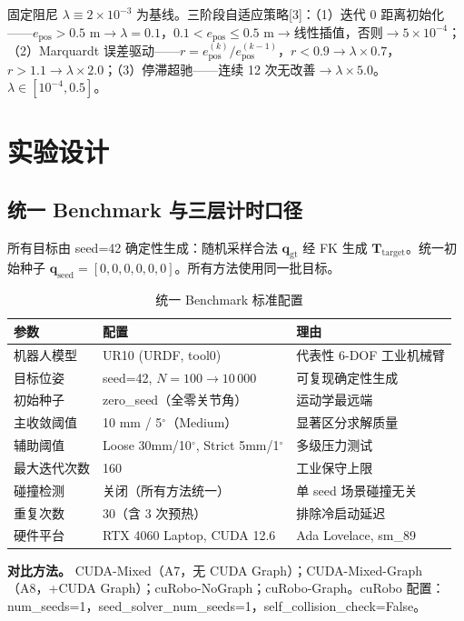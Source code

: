 \documentclass[twocolumn,a4paper,10pt]{ctexart}
\begin{document}
固定阻尼 $\lambda\equiv2\times10^{-3}$ 为基线。三阶段自适应策略[3]：（1）迭代 0 距离初始化——$e_{\mathrm{pos}}>0.5$ m$\to\lambda=0.1$，$0.1<e_{\mathrm{pos}}\le0.5$ m$\to$线性插值，否则$\to5\times10^{-4}$；（2）Marquardt 误差驱动——$r=e^{(k)}_{\mathrm{pos}}/e^{(k-1)}_{\mathrm{pos}}$，$r<0.9\to\lambda\times0.7$，$r>1.1\to\lambda\times2.0$；（3）停滞超驰——连续 12 次无改善$\to\lambda\times5.0$。$\lambda\in[10^{-4},0.5]$。

\section{实验设计}\label{sec:exp}

\subsection{统一 Benchmark 与三层计时口径}

所有目标由 seed=42 确定性生成：随机采样合法 $\mathbf{q}_{\mathrm{gt}}$ 经 FK 生成 $\mathbf{T}_{\mathrm{target}}$。统一初始种子 $\mathbf{q}_{\mathrm{seed}}=[0,0,0,0,0,0]$。所有方法使用同一批目标。

\begin{table}[ht]
\centering\small
\caption{统一 Benchmark 标准配置}
\label{tab:benchmark}
\begin{tabular}{lll}
\toprule
参数 & 配置 & 理由 \\
\midrule
机器人模型 & UR10 (URDF, tool0) & 代表性 6-DOF 工业机械臂 \\
目标位姿 & seed=42, $N=100\to10\,000$ & 可复现确定性生成 \\
初始种子 & zero\_seed（全零关节角） & 运动学最远端 \\
主收敛阈值 & 10 mm / 5$^\circ$（Medium） & 显著区分求解质量 \\
辅助阈值 & Loose 30mm/10$^\circ$, Strict 5mm/1$^\circ$ & 多级压力测试 \\
最大迭代次数 & 160 & 工业保守上限 \\
碰撞检测 & 关闭（所有方法统一） & 单 seed 场景碰撞无关 \\
重复次数 & 30（含 3 次预热） & 排除冷启动延迟 \\
硬件平台 & RTX 4060 Laptop, CUDA 12.6 & Ada Lovelace, sm\_89 \\
\bottomrule
\end{tabular}
\end{table}

{\bfseries 对比方法。} CUDA-Mixed（A7，无 CUDA Graph）；CUDA-Mixed-Graph（A8，+CUDA Graph）；cuRobo-NoGraph；cuRobo-Graph。cuRobo 配置：num\_seeds=1，seed\_solver\_num\_seeds=1，self\_collision\_check=False。
\end{document}

